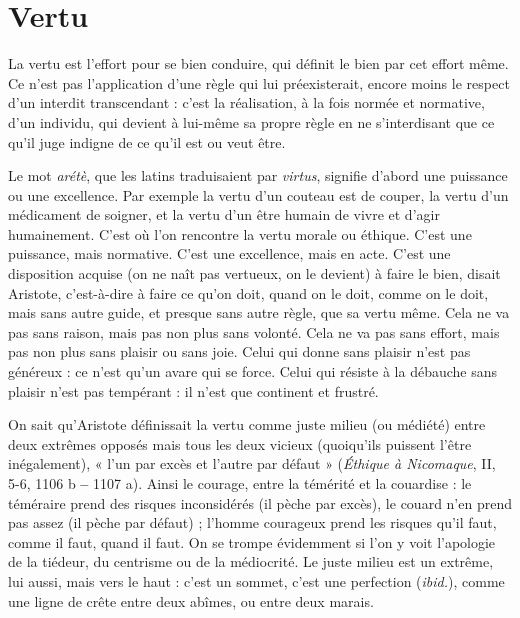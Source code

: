 \section{Vertu}
La vertu est l'effort pour se bien conduire, qui définit le bien par cet
effort même. Ce n’est pas l'application d’une règle qui lui préexisterait,
encore moins le respect d’un interdit transcendant : c’est la réalisation, à la
fois normée et normative, d’un individu, qui devient à lui-même sa propre
règle en ne s’interdisant que ce qu’il juge indigne de ce qu’il est ou veut être.

Le mot {\it arétè}, que les latins traduisaient par {\it virtus}, signifie d’abord une puissance
ou une excellence. Par exemple la vertu d’un couteau est de couper, la
vertu d’un médicament de soigner, et la vertu d’un être humain de vivre et
d’agir humainement. C’est où l’on rencontre la vertu morale ou éthique. C’est
une puissance, mais normative. C’est une excellence, mais en acte. C’est une
disposition acquise (on ne naît pas vertueux, on le devient) à faire le bien, disait
Aristote, c’est-à-dire à faire ce qu’on doit, quand on le doit, comme on le doit,
mais sans autre guide, et presque sans autre règle, que sa vertu même. Cela ne
va pas sans raison, mais pas non plus sans volonté. Cela ne va pas sans effort,
mais pas non plus sans plaisir ou sans joie. Celui qui donne sans plaisir n’est pas
généreux : ce n’est qu’un avare qui se force. Celui qui résiste à la débauche sans
plaisir n’est pas tempérant : il n’est que continent et frustré.

On sait qu’Aristote définissait la vertu comme juste milieu (ou médiété) entre
deux extrêmes opposés mais tous les deux vicieux (quoiqu’ils puissent l'être inégalement),
« l'un par excès et l’autre par défaut » ({\it Éthique à Nicomaque}, II, 5-6,
1106 b {\bf --} 1107 a). Ainsi le courage, entre la témérité et la couardise : le téméraire
prend des risques inconsidérés (il pèche par excès), le couard n’en prend pas assez
(il pèche par défaut) ; l'homme courageux prend les risques qu’il faut, comme il
faut, quand il faut. On se trompe évidemment si l’on y voit l’apologie de la tiédeur,
du centrisme ou de la médiocrité. Le juste milieu est un extrême, lui aussi,
mais vers le haut : c’est un sommet, c’est une perfection ({\it ibid.}), comme une ligne
de crête entre deux abîmes, ou entre deux marais.

